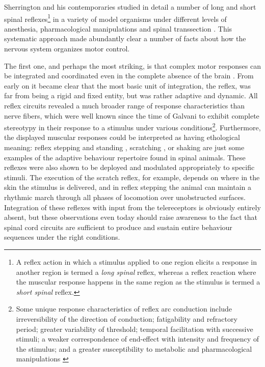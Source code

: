 Sherrington and his contemporaries studied in detail a number of long and short spinal reflexes\footnote{A reflex action in which a stimulus applied to one region elicits a response in another region is termed a \emph{long spinal} reflex, whereas a reflex reaction where the muscular response happens in the same region as the stimulus is termed a \emph{short spinal} reflex.} in a variety of model organisms under different levels of anesthesia, pharmacological manipulations and spinal transsection \cite{Sherrington1903}. This systematic approach made abundantly clear a number of facts about how the nervous system organizes motor control.

The first one, and perhaps the most striking, is that complex motor responses can be integrated and coordinated even in the complete absence of the brain \cite{Sherrington1906}. From early on it became clear that the most basic unit of integration, the reflex, was far from being a rigid and fixed entity, but was rather adaptive and dynamic. All reflex circuits revealed a much broader range of response characteristics than nerve fibers, which were well known since the time of Galvani to exhibit complete stereotypy in their response to a stimulus under various conditions\footnote{Some unique response characteristics of reflex arc conduction include irreversibility of the direction of conduction; fatigability and refractory period; greater variability of threshold; temporal facilitation with successive stimuli; a weaker correspondence of end-effect with intensity and frequency of the stimulus; and a greater susceptibility to metabolic and pharmacological manipulations \cite[p.14]{Sherrington1906}}. Furthermore, the displayed muscular responses could be interpreted as having ethological meaning: reflex stepping and standing \cite{Sherrington1910, Sherrington1915}, scratching \cite{Sherrington1903}, or shaking \cite{Goltz1896, Sherrington1903} are just some examples of the adaptive behaviour repertoire found in spinal animals. These reflexes were also shown to be deployed and modulated appropriately to specific stimuli. The execution of the scratch reflex, for example, depends on where in the skin the stimulus is delivered, and in reflex stepping the animal can maintain a rhythmic march through all phases of locomotion over unobstructed surfaces. Integration of these reflexes with input from the telereceptors is obviously entirely absent, but these observations even today should raise awareness to the fact that spinal cord circuits are sufficient to produce and sustain entire behaviour sequences under the right conditions.


